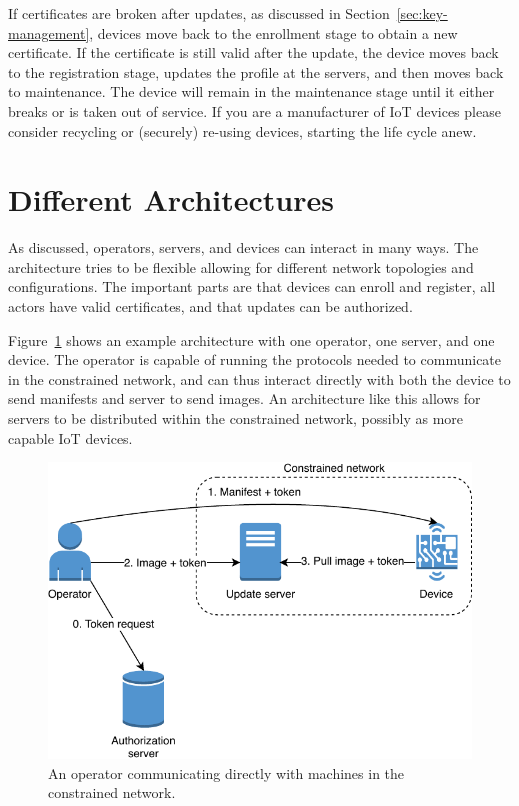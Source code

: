 \documentclass[0-thesis.tex]{subfiles}
\begin{document}
If certificates are broken after updates, as discussed in Section~\ref{sec:key-management},
devices move back to the enrollment stage to obtain a new certificate. If the certificate
is still valid after the update, the device moves back to the registration stage, updates
the profile at the servers, and then moves back to maintenance. The device will remain in
the maintenance stage until it either breaks or is taken out of service. If you are a
manufacturer of IoT devices please consider recycling or (securely) re-using devices,
starting the life cycle anew.


\section{Different Architectures}
\label{ssec:different-architectures}
As discussed, operators, servers, and devices can interact in many ways. The architecture
tries to be flexible allowing for different network topologies and configurations. The
important parts are that devices can enroll and register, all actors have valid
certificates, and that updates can be authorized. 

Figure~\ref{fig:operator-direct} shows an example architecture with one operator, one
server, and one device. The operator is capable of running the protocols needed to
communicate in the constrained network, and can thus interact directly with both the
device to send manifests and server to send images. An architecture like this allows for
servers to be distributed within the constrained network, possibly as more capable IoT
devices.

\begin{figure}
    \caption{An operator communicating directly with machines in the constrained network.}
    \label{fig:operator-direct}
    \includegraphics{images/operator-direct.pdf}
\end{figure}
\end{document}
